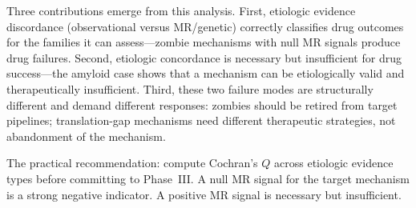 \documentclass[11pt]{article}
\begin{document}
Three contributions emerge from this analysis. First, etiologic evidence discordance (observational versus MR/genetic) correctly classifies drug outcomes for the families it can assess---zombie mechanisms with null MR signals produce drug failures. Second, etiologic concordance is necessary but insufficient for drug success---the amyloid case shows that a mechanism can be etiologically valid and therapeutically insufficient. Third, these two failure modes are structurally different and demand different responses: zombies should be retired from target pipelines; translation-gap mechanisms need different therapeutic strategies, not abandonment of the mechanism.

The practical recommendation: compute Cochran's $Q$ across etiologic evidence types before committing to Phase~III. A null MR signal for the target mechanism is a strong negative indicator. A positive MR signal is necessary but insufficient.



\end{document}
